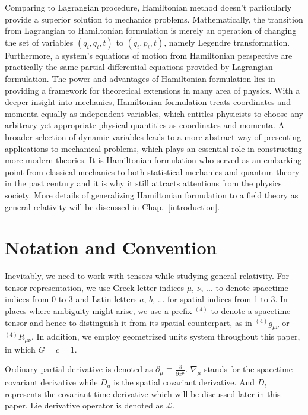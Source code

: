 Comparing to Lagrangian procedure, Hamiltonian method doesn't particularly provide a superior solution to mechanics problems. Mathematically, the transition from Lagrangian to Hamiltonian formulation is merely an operation of changing the set of variables $(q_{i}, {\dot q}_{i}, t)$ to $(q_{i}, p_{i}, t)$, namely Legendre transformation. Furthermore, a system's equations of motion from Hamiltonian perspective are practically the same partial differential equations provided by Lagrangian formulation. The power and advantages of Hamiltonian formulation lies in providing a framework for theoretical extensions in many area of physics. With a deeper insight into mechanics, Hamiltonian formulation treats coordinates and momenta equally as independent variables, which entitles physicists to choose any arbitrary yet appropriate physical quantities as coordinates and momenta. A broader selection of dynamic variables leads to a more abstract way of presenting applications to mechanical problems, which plays an essential role in constructing more modern theories. It is Hamiltonian formulation who served as an embarking point from classical mechanics to both statistical mechanics and quantum theory in the past century and it is why it still attracts attentions from the physics society\cite{goldstein}. More details of generalizing Hamiltonian formulation to a field theory as general relativity will be discussed in Chap.~\ref{introduction}. 
\section{Notation and Convention}\label{notation}
Inevitably, we need to work with tensors while studying general relativity. For tensor representation, we use Greek letter indices $\mu$, $\nu$, ... to denote spacetime indices from 0 to 3 and Latin letters $a$, $b$, ... for spatial indices from 1 to 3. In places where ambiguity might arise, we use a prefix $^{(4)}$ to denote a spacetime tensor and hence to distinguish it from its spatial counterpart, as in $^{(4)}g_{\mu\nu}$ or $^{(4)}R_{\mu\nu}$. In addition, we employ geometrized  units system throughout this paper, in which $G = c = 1$.

Ordinary partial derivative is denoted as $
\partial_{\mu} \equiv \frac{\partial}{\partial x^{\mu}}$. $\nabla_{\mu}$ stands for the spacetime covariant derivative while $D_{a}$ is the spatial covariant derivative. And $D_{t}$ represents the covariant time derivative which will be discussed later in this paper. Lie derivative operator is denoted as $\mathcal{L}$. 

